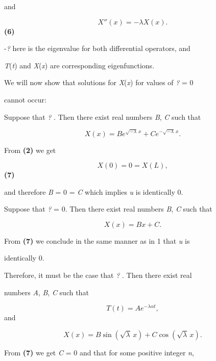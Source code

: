 and



$$X''(x) = - \lambda X(x).$$ \textbf{(6)}



-\textit{?} here is the eigenvalue for both differential operators, and

\textit{T}(\textit{t}) and \textit{X}(\textit{x}) are corresponding eigenfunctions.



We will now show that solutions for \textit{X}(\textit{x}) for values of \textit{?} = 0

cannot occur:



Suppose that \textit{?} . Then there exist real numbers \textit{B}, \textit{C} such that



$$X(x) = B e^{\sqrt{-\lambda} \, x} + C e^{-\sqrt{-\lambda} \, x}.$$



From \textbf{(2)} we get



$$X(0) = 0 = X(L),$$ \textbf{(7)}



and therefore \textit{B} = 0 = \textit{C} which implies \textit{u} is identically 0.



Suppose that \textit{?} = 0. Then there exist real numbers \textit{B}, \textit{C} such that



$$X(x) = Bx + C.$$



From \textbf{(7)} we conclude in the same manner as in 1 that \textit{u} is

identically 0.



Therefore, it must be the case that \textit{?} . Then there exist real

numbers \textit{A}, \textit{B}, \textit{C} such that



$$T(t) = A e^{-\lambda \alpha t},$$ and



$$X(x) = B \sin(\sqrt{\lambda} \, x) + C \cos(\sqrt{\lambda} \, x).$$



From \textbf{(7)} we get \textit{C} = 0 and that for some positive integer \textit{n},



